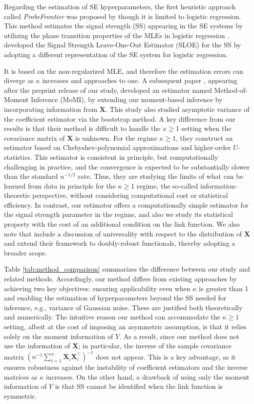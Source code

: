 \documentclass[12pt,reqno]{amsart}
\newcommand{\rc}{\color{black}}
\newcommand{\cc}{\color{black}}
\newcommand{\ccc}{\color{black}}
\def\bX{\bm{X}}
\begin{document}
Regarding the estimation of SE hyperparameters, the first heuristic approach called \textit{ProbeFrontier} was proposed by \cite{sur2019modern} though it is limited to logistic regression. This method estimates the signal strength (SS) appearing in the SE systems by utilizing the phase transition properties of the MLEs in logistic regression \cite{candes2020phase}. \cite{yadlowsky2021sloe} developed the Signal Strength Leave-One-Out Estimator (SLOE) for the SS by adopting a different representation of the SE system for logistic regression.  
{\rc
It is based on the non-regularized MLE, and therefore the estimation errors can diverge as $\kappa$ increases and approaches to one.
A subsequent paper \cite{chen2024method}, appearing after the preprint release of our study, developed an estimator named Method-of-Moment Inference (MoMI), by extending our moment-based {\cc inference by} incorporating information from $\bX$. 
This study also studied asymptotic variance of the coefficient estimator via the bootstrap method. 
A key difference from our results is that their method {\ccc is difficult to} handle the $ \kappa\geq 1 $ setting when the covariance matrix of $\bX$ is unknown.
{\ccc For the regime $\kappa\geq 1$, they construct an estimator based on Chebyshev-polynomial approximations and higher-order $U$-statistics.
This estimator is consistent in principle, but computationally challenging in practice, and the convergence is expected to be substantially slower than the standard $n^{-1/2}$ rate.
Thus, they are studying the limits of what can be learned from data in principle for the $\kappa \geq 1$ regime, the so-called information-theoretic perspective, without considering computational cost or statistical efficiency.
In contrast, our estimator offers a computationally simple estimator for the signal strength parameter in the regime, and also we study its statistical property with the cost of an additional condition on the link function.
}
 We also note that \citep{chen2024method} include a discussion of universality with respect to the distribution of $\bX$ and extend their framework to doubly-robust functionals, thereby adopting a broader scope.

Table \ref{tab:method_comparison} summarizes the difference between our study and related methods. Accordingly, our method differs from existing approaches by achieving two key objectives: ensuring applicability even when $\kappa$ is greater than 1 and enabling the estimation of hyperparameters beyond the SS needed for inference, e.g., variance of Gaussian noise.
These are justified both theoretically and numerically.
The intuitive reason our method can accommodate the $\kappa\geq 1$ setting, albeit at the cost of imposing an asymmetric assumption, is that it relies solely on the moment information of $Y$. As a result, since our method does not use the information of $\bX${\cc; in particular,} the inverse of the sample covariance matrix $(n^{-1}\sum_{i=1}^n\bX_i\bX_i^\top)^{-1}$ does not appear. This is a key advantage, as it ensures robustness against the instability of coefficient estimators and the inverse matrices as $\kappa$ increases.
On the other hand, a drawback of using only the moment information of $Y$ is that SS cannot be identified when the link function is symmetric.
}
\end{document}
